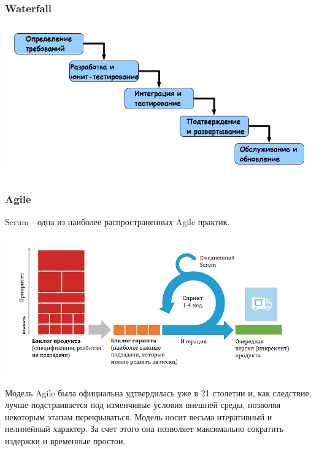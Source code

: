 \documentclass{../industrial-development}
\begin{document}
\begin{frame} \frametitle{Waterfall}
\centerline{\includegraphics[height=0.6\textheight]{w1.png}}
\end{frame}

\begin{frame} \frametitle{Agile}
\alert{Scrum}---одна из наиболее распространенных Agile практик.
\centerline{\includegraphics[height=0.6\textheight]{scrum.png}}
\end{frame}
\lecturenotes
Модель Agile была официальна удтвердилась уже в 21 столетии и, как следствие, лучше подстраивается под изменчивые условия внешней среды, позволяя некоторым этапам перекрываться. Модель носит весьма итеративный и нелинейный характер. За счет этого она позволяет максимально сократить издержки и временные простои. 
\end{document}
